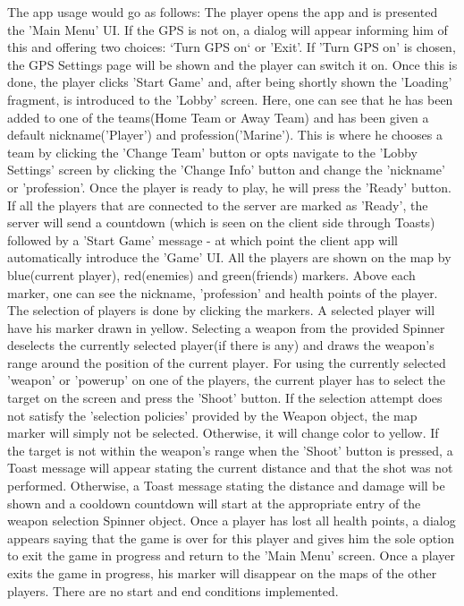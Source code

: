 \documentclass{article}
\begin{document}
The app usage would go as follows: The player opens the app and is presented the
'Main Menu' UI. If the GPS is not on, a dialog will appear informing him of
this and offering two choices: `Turn GPS on` or 'Exit'. If 'Turn GPS on' is
chosen, the GPS Settings page will be shown and the player can switch it on.
Once this is done, the player clicks 'Start Game' and, after being shortly shown
the 'Loading' fragment, is introduced to the 'Lobby' screen. Here, one can see
that he has been added to one of the teams(Home Team or Away Team) and has been
given a default nickname('Player') and profession('Marine'). This is where he
chooses a team by clicking the 'Change Team' button or opts navigate to the
'Lobby Settings' screen by clicking the 'Change Info' button and change the
'nickname' or 'profession'. Once the player is ready to play, he will press the
'Ready' button. If all the players that are connected to the server are marked
as 'Ready', the server will send a countdown (which is seen on the client side
through Toasts) followed by a 'Start Game' message - at which point the client
app will automatically introduce the 'Game' UI. All the players are shown on the
map by blue(current player), red(enemies) and green(friends) markers. Above each
marker, one can see the nickname, 'profession' and health points of the player.
The selection of players is done by clicking the markers. A selected player will
have his marker drawn in yellow. Selecting a weapon from the provided Spinner
deselects the currently selected player(if there is any) and draws the weapon's
range around the position of the current player. For using the currently
selected 'weapon' or 'powerup' on one of the players, the current player has to
select the target on the screen and press the 'Shoot' button. If the selection
attempt does not satisfy the 'selection policies' provided by the Weapon object,
the map marker will simply not be selected. Otherwise, it will change color to
yellow. If the target is not within the weapon's range when the 'Shoot' button
is pressed, a Toast message will appear stating the current distance and that
the shot was not performed. Otherwise, a Toast message stating the distance and
damage will be shown and a cooldown countdown will start at the appropriate
entry of the weapon selection Spinner object. Once a player has lost all health
points, a dialog appears saying that the game is over for this player and gives
him the sole option to exit the game in progress and return to the 'Main Menu'
screen. Once a player exits the game in progress, his marker will disappear on
the maps of the other players. There are no start and end conditions
implemented.
\end{document}
